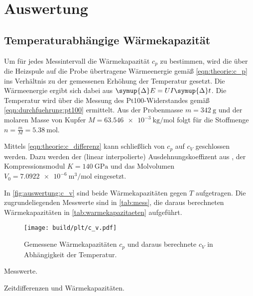 \section{Auswertung}
\label{sec:auswertung}

\subsection{Temperaturabhängige Wärmekapazität}
Um für jedes Messintervall die Wärmekapazität $c_p$ zu bestimmen,
wird die über die Heizspule auf die Probe übertragene Wärmeenergie
gemäß \autoref{eqn:theorie:c_p} %
ins Verhältnis zu der gemessenen Erhöhung der Temperatur gesetzt.
Die Wärmeenergie ergibt sich dabei aus $\symup{\Delta}E = U I \symup{\Delta}t$.
Die Temperatur wird über die Messung des Pt100-Widerstandes gemäß \autoref{eqn:durchfuehrung:pt100} ermittelt.
Aus der Probenmasse $m = \SI{342}{\gram}$ \cite{versuchsanleitung}
und der molaren Masse von Kupfer $M = \SI{63.546e-3}{\kilogram\per\mol}$ \cite{periodictable}
folgt für die Stoffmenge $n = \frac{m}{M} = \SI{5.38}{\mol}$.

Mittels \autoref{eqn:theorie:c_differenz} kann schließlich von $c_p$ auf $c_V$ geschlossen werden.
Dazu werden
der (linear interpolierte) Ausdehnungskoeffizent aus \cite[Tabelle 2]{versuchsanleitung},
der Kompressionsmodul $K = \SI{140}{\giga\pascal}$ \cite{periodictable} und
das Molvolumen $V_0 = \SI{7.0922e-6}{\cubic\meter\per\mol}$ eingesetzt.

In \autoref{fig:auswertung:c_v} sind beide Wärmekapazitäten gegen $T$ aufgetragen.
Die zugrundeliegenden Messwerte sind in \autoref{tab:mess},
die daraus berechneten Wärmekapazitäten in \autoref{tab:warmekapazitaeten} aufgeführt.

\begin{figure}[H]
    \centering
    \texttt{[image: build/plt/c\_v.pdf]}
    \caption{Gemessene Wärmekapazitäten $c_p$ und daraus berechnete $c_V$ in Abhängigkeit der Temperatur.}
    \label{fig:auswertung:c_v}
\end{figure}

\begin{table}
    \centering
    \caption{Messwerte.}
    \label{tab:mess}
\end{table}

\begin{table}
    \centering
    \caption{Zeitdifferenzen und Wärmekapazitäten.}
    \label{tab:warmekapazitaeten}
\end{table}


